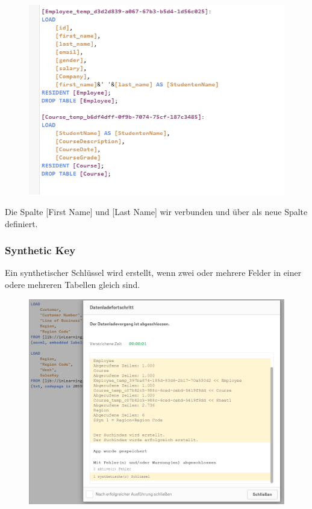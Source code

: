 \begin{figure}[H]
	\centering
	\includegraphics[scale = 0.3]{attachment/chapter_3/Scc028}
	\caption{}
	\label{fig:Scc028}
\end{figure}
Die Spalte [First Name] und [Last Name] wir verbunden und über  als neue Spalte definiert.



\subsubsection{Synthetic Key}
Ein synthetischer Schlüssel wird erstellt, wenn zwei oder mehrere Felder in einer odere mehreren Tabellen gleich sind. 
\begin{figure}[H]
	\centering
	\includegraphics[scale = 0.3]{attachment/chapter_3/Scc026}
	\caption{}
	\label{fig:Scc026}
\end{figure}

